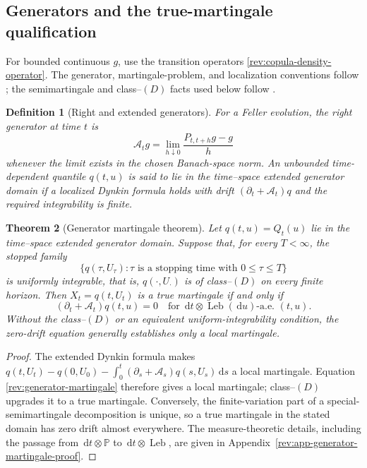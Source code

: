 \documentclass[11pt]{article}
\newtheorem{definition}{Definition}[section]
\newtheorem{theorem}[definition]{Theorem}
\theoremstyle{remark}
\newcommand{\Pp}{\mathbb P}
\newcommand{\dd}{\,\mathrm d}
\newcommand{\Leb}{\operatorname{Leb}}
\begin{document}
\subsection{Generators and the true-martingale qualification}

For bounded continuous $g$, use the transition operators
\eqref{rev:copula-density-operator}.  The generator, martingale-problem, and
localization conventions follow \citet[Chapter~4]{EthierKurtz1986}; the
semimartingale and class--$(D)$ facts used below follow
\citet[Chapters~I--III]{Protter2005}.

\begin{definition}[Right and extended generators]
\label{rev:def-generator}
For a Feller evolution, the right generator at time $t$ is
\begin{equation}
\mathcal A_tg=\lim_{h\downarrow0}
\frac{P_{t,t+h}g-g}{h}
\label{rev:right-generator}
\end{equation}
whenever the limit exists in the chosen Banach-space norm.  An unbounded
time-dependent quantile $q(t,u)$ is said to lie in the time--space
\emph{extended generator domain} if a localized Dynkin formula holds with
drift $(\partial_t+\mathcal A_t)q$ and the required integrability is finite.
\end{definition}

\begin{theorem}[Generator martingale theorem]
\label{rev:thm-generator-martingale}
Let $q(t,u)=Q_t(u)$ lie in the time--space extended generator domain.  Suppose
that, for every $T<\infty$, the stopped family
\[
\{q(\tau,U_\tau):\tau\text{ is a stopping time with }0\le\tau\le T\}
\]
is uniformly integrable, that is, $q(\cdot,U_\cdot)$ is of class--$(D)$ on
every finite horizon.  Then
$X_t=q(t,U_t)$ is a true martingale if and only if
\begin{equation}
(\partial_t+\mathcal A_t)q(t,u)=0
\quad\text{for }\dd t\otimes\Leb(\dd u)\text{-a.e. }(t,u).
\label{rev:generator-martingale}
\end{equation}
Without the class--$(D)$ or an equivalent uniform-integrability condition, the
zero-drift equation generally establishes only a local martingale.
\end{theorem}

\begin{proof}
The extended Dynkin formula makes
$q(t,U_t)-q(0,U_0)-\int_0^t(\partial_s+\mathcal A_s)q(s,U_s)\dd s$
a local martingale.  Equation \eqref{rev:generator-martingale} therefore gives
a local martingale; class--$(D)$ upgrades it to a true martingale.  Conversely,
the finite-variation part of a special-semimartingale decomposition is unique,
so a true martingale in the stated domain has zero drift almost everywhere.
The measure-theoretic details, including the passage from
$\dd t\otimes\Pp$ to $\dd t\otimes\Leb$, are given in
Appendix~\ref{rev:app-generator-martingale-proof}.
\end{proof}
\end{document}
